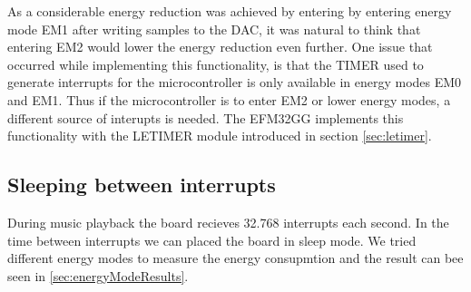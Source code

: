 As a considerable energy reduction was achieved by entering by entering energy mode EM1 after writing samples to the DAC, it was natural to think that entering EM2 would lower the energy reduction even further. One issue that occurred while implementing this functionality, is that the TIMER used to generate interrupts for the microcontroller is only available in energy modes EM0 and EM1. Thus if the microcontroller is to enter EM2 or lower energy modes, a different source of interupts is needed. The EFM32GG implements this functionality with the LETIMER module introduced in section \ref{sec:letimer}.

\subsection{Sleeping between interrupts}
During music playback the board recieves 32.768 interrupts each second. In the time between interrupts we can placed the board in sleep mode. We tried different energy modes to measure the energy consupmtion and the result can bee seen in \ref{sec:energyModeResults}.
